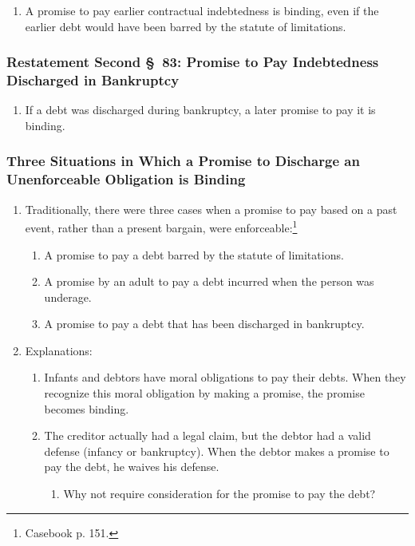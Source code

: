 \begin{enumerate}
    \item A promise to pay earlier contractual indebtedness is binding, even 
    if the earlier debt would have been barred by the statute of limitations.
\end{enumerate}

\subsubsection{Restatement Second \S\ 83: Promise to Pay Indebtedness 
Discharged in Bankruptcy}

\begin{enumerate}
    \item If a debt was discharged during bankruptcy, a later promise to pay 
    it is binding.
\end{enumerate}

\subsubsection{Three Situations in Which a Promise to Discharge an Unenforceable 
Obligation is Binding}

\begin{enumerate}
    \item Traditionally, there were three cases when a promise to pay based on 
    a past event, rather than a present bargain, were 
    enforceable:\footnote{Casebook p. 151.}
    \begin{enumerate}
        \item A promise to pay a debt barred by the statute of limitations.
        \item A promise by an adult to pay a debt incurred when the person was 
        underage.
        \item A promise to pay a debt that has been discharged in bankruptcy.
    \end{enumerate}
    \item Explanations:
    \begin{enumerate}
        \item Infants and debtors have moral obligations to pay their debts. 
        When they recognize this moral obligation by making a promise, the 
        promise becomes binding.
        \item The creditor actually had a legal claim, but the debtor had a 
        valid defense (infancy or bankruptcy). When the debtor makes a 
        promise to pay the debt, he waives his defense.
        \begin{enumerate}
            \item Why not require consideration for the promise to pay the 
            debt?
        \end{enumerate}
    \end{enumerate}
\end{enumerate}

